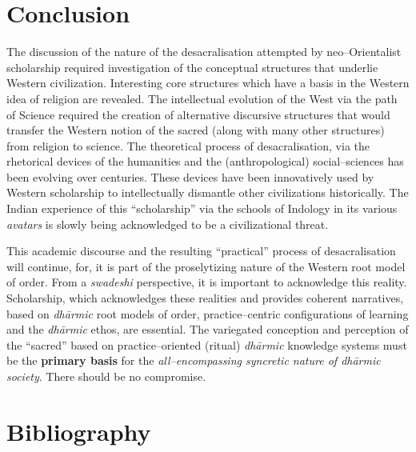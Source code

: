 \section*{Conclusion}

The discussion of the nature of the desacralisation attempted by neo–Orientalist scholarship required investigation of the conceptual structures that underlie Western civilization. Interesting core structures which have a basis in the Western idea of religion are revealed. The intellectual evolution of the West via the path of Science required the creation of alternative discursive structures that would transfer the Western notion of the sacred (along with many other structures) from religion to science. The theoretical process of desacralisation, via the rhetorical devices of the humanities and the (anthropological) social–sciences has been evolving over centuries. These devices have been innovatively used by Western scholarship to intellectually dismantle other civilizations historically. The Indian experience of this “scholarship” via the schools of Indology in its various \textit{avatars} is slowly being acknowledged to be a civilizational threat. 

This academic discourse and the resulting “practical” process of desacralisation will continue, for, it is part of the proselytizing nature of the Western root model of order. From a \textit{swadeshi} perspective, it is important to acknowledge this reality. Scholarship, which acknowledges these realities and provides coherent narratives, based on \textit{dhārmic} root models of order, practice–centric configurations of learning and the \textit{dhārmic} ethos, are essential. The variegated conception and perception of the “sacred” based on practice–oriented (ritual) \textit{dhārmic} knowledge systems must be the \textbf{primary basis} for the\textit{ all–encompassing syncretic nature of dhārmic society}. There should be no compromise.


\section*{Bibliography}

